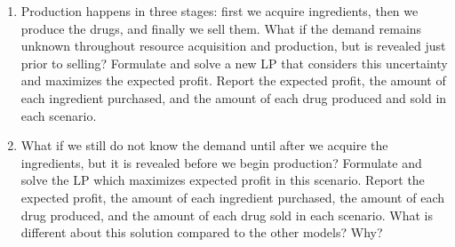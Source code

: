 \begin{exercise}
\begin{enumerate}
\item Production happens in three stages: first we acquire ingredients, then we produce the drugs, and finally we sell them. What if the demand remains unknown throughout resource acquisition and production, but is revealed just prior to selling? Formulate and solve a new LP that considers this uncertainty and maximizes the expected profit. Report the expected profit, the amount of each ingredient purchased, and the amount of each drug produced and sold in each scenario.
 
\item What if we still do not know the demand until after we acquire the ingredients, but it is revealed before we begin production? Formulate and solve the LP which maximizes expected profit in this scenario. Report the expected profit, the amount of each ingredient purchased, the amount of each drug produced, and the amount of each drug sold in each scenario. What is different about this solution compared to the other models? Why?

\end{enumerate}

\end{exercise}
